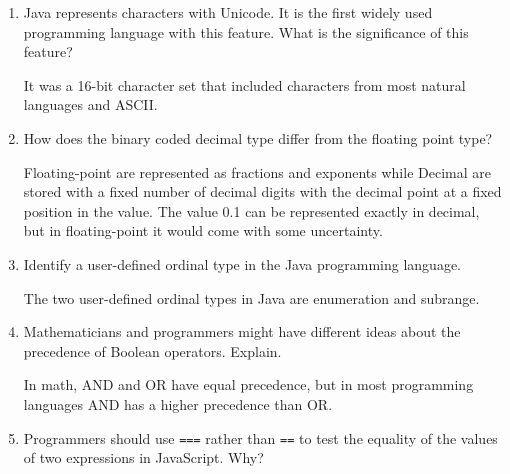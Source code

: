 \begin{enumerate}
\begin{answer}
    \end{answer}

  \item Java represents characters with Unicode. It is the first
    widely used programming language with this feature. What is the
    significance of this feature?

  \begin{answer}

    It was a 16-bit character set that included characters from most
    natural languages and ASCII.

    \end{answer}

  \item How does the binary coded decimal type differ from the
    floating point type?

  \begin{answer}

    Floating-point are represented as fractions and exponents while
    Decimal are stored with a fixed number of decimal digits with the
    decimal point at a fixed position in the value.  The value 0.1 can
    be represented exactly in decimal, but in floating-point it would
    come with some uncertainty.

    \end{answer}

  \item Identify a user-defined ordinal type in the Java programming
    language.

  \begin{answer}

    The two user-defined ordinal types in Java are enumeration and subrange.

    \end{answer}

  \item Mathematicians and programmers might have different ideas
    about the precedence of Boolean operators. Explain.

  \begin{answer}

    In math, AND and OR have equal precedence, but in most programming
    languages AND has a higher precedence than OR.

    \end{answer}

  \item Programmers should use \verb+===+ rather than \verb+==+ to
    test the equality of the values of two expressions in JavaScript. Why?


\end{enumerate}
